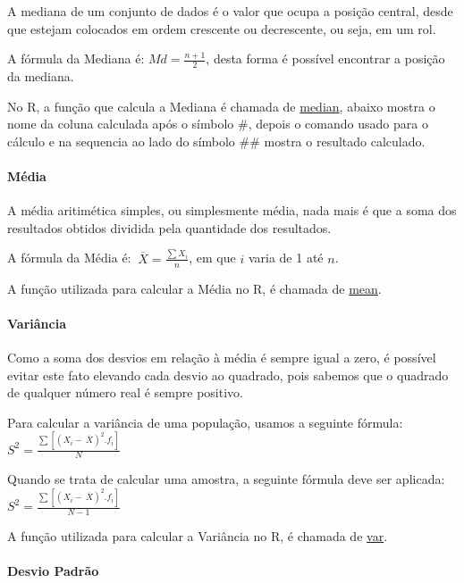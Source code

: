 \documentclass[portuguese,]{article}
\let\oldparagraph\paragraph
\renewcommand{\paragraph}[1]{\oldparagraph{#1}\mbox{}}
\begin{document}
A mediana de um conjunto de dados é o valor que ocupa a posição central,
desde que estejam colocados em ordem crescente ou decrescente, ou seja,
em um rol.

A fórmula da Mediana é: \(Md = \frac{n+1}{2}\), desta forma é possível
encontrar a posição da mediana.

No R, a função que calcula a Mediana é chamada de
\href{https://www.rdocumentation.org/packages/stats/versions/3.5.2/topics/median}{median},
abaixo mostra o nome da coluna calculada após o símbolo \#, depois o
comando usado para o cálculo e na sequencia ao lado do símbolo \#\#
mostra o resultado calculado.

\paragraph{Média}\label{media}

A média aritimética simples, ou simplesmente média, nada mais é que a
soma dos resultados obtidos dividida pela quantidade dos resultados.

A fórmula da Média é: \(\ \overline{X} = \frac{\sum{X_i}}{n}\), em que
\(i\) varia de 1 até \(n\).

A função utilizada para calcular a Média no R, é chamada de
\href{https://www.rdocumentation.org/packages/base/versions/3.5.2/topics/mean}{mean}.

\paragraph{Variância}\label{variancia}

Como a soma dos desvios em relação à média é sempre igual a zero, é
possível evitar este fato elevando cada desvio ao quadrado, pois sabemos
que o quadrado de qualquer número real é sempre positivo.

Para calcular a variância de uma população, usamos a seguinte fórmula:
\(S^2=\frac{\sum[(X_i-\ \overline{X})^2.f_i]}{N}\)

Quando se trata de calcular uma amostra, a seguinte fórmula deve ser
aplicada: \(S^2=\frac{\sum[(X_i-\ \overline{X})^2.f_i]}{N-1}\)

A função utilizada para calcular a Variância no R, é chamada de
\href{https://www.rdocumentation.org/packages/cmvnorm/versions/1.0-5/topics/var}{var}.

\paragraph{Desvio Padrão}\label{desvio-padrao}
\end{document}
